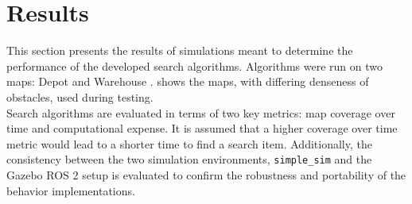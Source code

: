 \section{Results}
\label{sec:results}
This section presents the results of simulations meant to determine the performance of the developed search algorithms. Algorithms were run on two maps: Depot and Warehouse \cite{gz-worlds}.  shows the maps, with differing denseness of obstacles, used during testing. \\

Search algorithms are evaluated in terms of two key metrics: map coverage over time and computational expense. It is assumed that a higher coverage over time metric would lead to a shorter time to find a search item. Additionally, the consistency between the two simulation environments, \texttt{simple\_sim} and the Gazebo ROS 2 setup is evaluated to confirm the robustness and portability of the behavior implementations.

